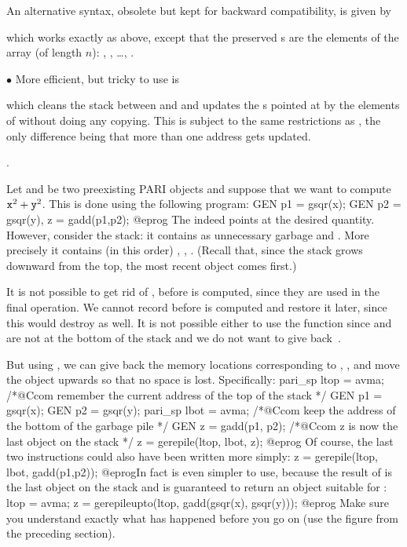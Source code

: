 An alternative syntax, obsolete but kept for backward compatibility, is
given by


\noindent which works exactly as above, except that the preserved s
are the elements of the array  (of length $n$): ,
, \dots, .

\noindent$\bullet$ More efficient, but tricky to use is


\noindent which cleans the stack between  and  and
updates the s pointed at by the elements of  without doing
any copying. This is subject to the same restrictions as , the
only difference being that more than one address gets updated.

.


Let  and  be two preexisting PARI objects and suppose that we
want to compute ${\tt x}^2 + {\tt y}^2$. This is done using the following
program:
\bprog
  GEN p1 = gsqr(x);
  GEN p2 = gsqr(y), z = gadd(p1,p2);
@eprog\noindent
The   indeed points at the desired quantity. However,
consider the stack: it contains as unnecessary garbage  and .
More precisely it contains (in this order) , , .
(Recall that, since the stack grows downward from the top, the most recent
object comes first.)

It is not possible to get rid of ,  before  is
computed, since they are used in the final operation. We cannot record
 before  is computed and restore it later, since this would
destroy  as well. It is not possible either to use the function
 since  and  are not at the bottom of the stack and
we do not want to give back~.

But using , we can give back the memory locations corresponding
to , , and move the object  upwards so that no
space is lost. Specifically:
\bprog
  pari_sp ltop = avma;  /*@Ccom remember the current address of the top of the stack */
  GEN p1 = gsqr(x);
  GEN p2 = gsqr(y);
  pari_sp lbot = avma;  /*@Ccom keep the address of the bottom of the garbage pile */
  GEN z = gadd(p1, p2); /*@Ccom z is now the last object on the stack */
  z = gerepile(ltop, lbot, z);
@eprog
\noindent Of course, the last two instructions could also have been
written more simply:
\bprog
  z = gerepile(ltop, lbot, gadd(p1,p2));
@eprog\noindent In fact  is even simpler to use, because
the result of  is the last object on the stack and 
is guaranteed to return an object suitable for :
\bprog
  ltop = avma;
  z = gerepileupto(ltop, gadd(gsqr(x), gsqr(y)));
@eprog\noindent
Make sure you understand exactly what has happened before you go on (use the
figure from the preceding section).

